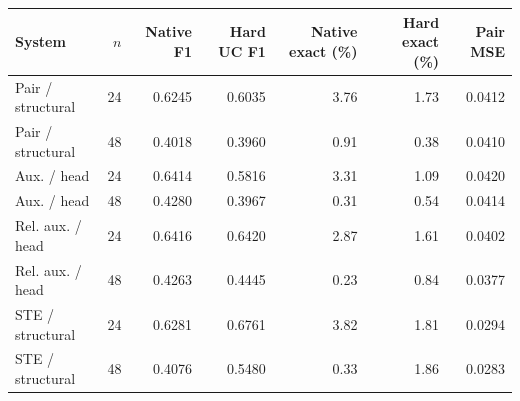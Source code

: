 \begin{tabular*}{\linewidth}{@{\extracolsep{\fill}}lrrrrrr}
\toprule
System & $n$ & Native F1 & Hard UC F1 & Native exact (\%) & Hard exact (\%) & Pair MSE \\
\midrule
Pair / structural & 24 & 0.6245 & 0.6035 & 3.76 & 1.73 & 0.0412 \\
Pair / structural & 48 & 0.4018 & 0.3960 & 0.91 & 0.38 & 0.0410 \\
Aux. / head & 24 & 0.6414 & 0.5816 & 3.31 & 1.09 & 0.0420 \\
Aux. / head & 48 & 0.4280 & 0.3967 & 0.31 & 0.54 & 0.0414 \\
Rel. aux. / head & 24 & 0.6416 & 0.6420 & 2.87 & 1.61 & 0.0402 \\
Rel. aux. / head & 48 & 0.4263 & 0.4445 & 0.23 & 0.84 & 0.0377 \\
STE / structural & 24 & 0.6281 & 0.6761 & 3.82 & 1.81 & 0.0294 \\
STE / structural & 48 & 0.4076 & 0.5480 & 0.33 & 1.86 & 0.0283 \\
\bottomrule
\end{tabular*}
